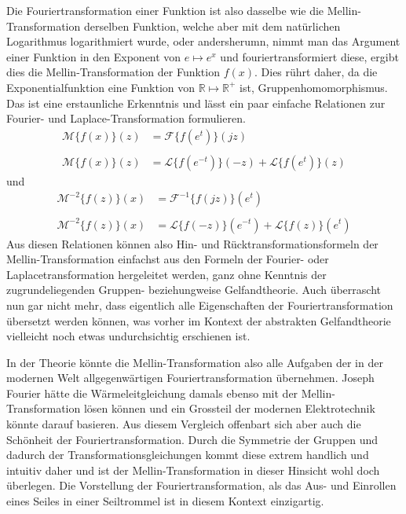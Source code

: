 Die Fouriertransformation einer Funktion ist also dasselbe wie die Mellin-Transformation derselben Funktion, welche aber
mit dem natürlichen Logarithmus logarithmiert wurde, oder andersherumn, nimmt man das Argument einer Funktion 
in den Exponent von $e \mapsto e^x$ und fouriertransformiert diese, ergibt dies die Mellin-Transformation der Funktion $f(x)$.
Dies rührt daher, da die Exponentialfunktion eine Funktion von $\mathbb{R} \mapsto \mathbb{R^+}$ ist, 
Gruppenhomomorphismus.
Das ist eine erstaunliche Erkenntnis und lässt ein paar einfache Relationen zur Fourier- und Laplace-Transformation 
formulieren.
\begin{align*}
    \mathcal{M}\{f(x)\}(z) &= \mathcal{F}\{f (e^{t})\}(jz) \\ \\
    \mathcal{M}\{f(x)\}(z) &= \mathcal{L}\{f (e^{-t})\}(-z) + \mathcal{L}\{f (e^{t})\}(z) 
\end{align*}
und
\begin{align*}
    \mathcal{M^{-2}}\{f(z)\}(x) &= \mathcal{F^{-1}}\{f (jz)\}(e^t) \\ \\
    \mathcal{M^{-2}}\{f(z)\}(x) &= \mathcal{L}\{f (-z)\}(e^{-t}) + \mathcal{L}\{f (z)\}(e^{t}) 
\end{align*}
Aus diesen Relationen können also Hin- und Rücktransformationsformeln der Mellin-Transformation einfachst aus den Formeln der 
Fourier- oder Laplacetransformation hergeleitet werden, ganz ohne Kenntnis der zugrundeliegenden Gruppen- beziehungweise Gelfandtheorie.
Auch überrascht nun gar nicht mehr, dass eigentlich alle Eigenschaften der Fouriertransformation übersetzt werden können, 
was vorher im Kontext der abstrakten Gelfandtheorie vielleicht noch etwas undurchsichtig erschienen ist.

In der Theorie könnte die Mellin-Transformation also alle Aufgaben der in der modernen Welt allgegenwärtigen Fouriertransformation 
übernehmen. 
Joseph Fourier hätte die Wärmeleitgleichung damals ebenso mit der Mellin-Transformation lösen können und ein Grossteil der modernen 
Elektrotechnik könnte darauf basieren. 
Aus diesem Vergleich offenbart sich aber auch die Schönheit der Fouriertransformation. 
Durch die Symmetrie der Gruppen und dadurch der Transformationsgleichungen kommt diese extrem handlich und intuitiv daher und ist der 
Mellin-Transformation in dieser Hinsicht wohl doch überlegen.
Die Vorstellung der Fouriertransformation, als das Aus- und Einrollen eines Seiles in einer Seiltrommel ist in diesem Kontext einzigartig.



